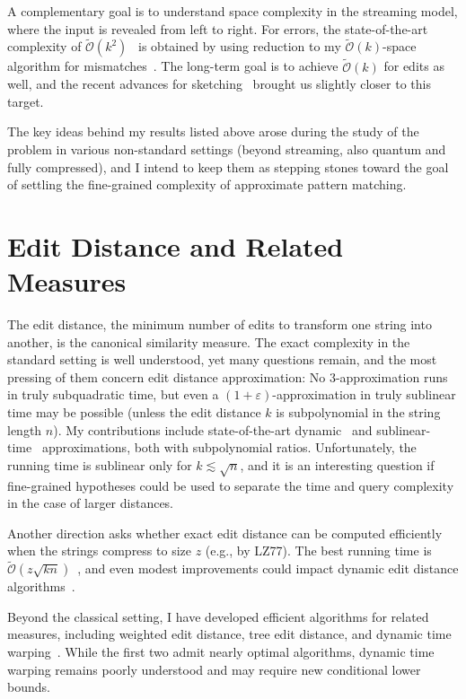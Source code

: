 \documentclass[a4paper,11pt]{article}
\newcommand{\eps}{\varepsilon}
\newcommand{\Ohtilde}{\tilde{\mathcal{O}}}
\begin{document}
A complementary goal is to understand space complexity in the streaming model, where the input is revealed from left to right.
For errors, the state-of-the-art complexity of $\Ohtilde(k^2)$~\cite{BK23a} is obtained by using reduction to my $\Ohtilde(k)$-space algorithm for mismatches~\cite{CKP19}. The long-term goal is to achieve $\Ohtilde(k)$ for edits as well, and the recent advances for sketching~\cite{KS24} brought us slightly closer to this target.

The key ideas behind my results listed above arose during the study of the problem in various non-standard settings (beyond streaming, also quantum and fully compressed), and I intend to keep them as stepping stones toward the goal of settling the fine-grained complexity of approximate pattern matching.


\section{Edit Distance and Related Measures}

The edit distance, the minimum number of edits to transform one string into another, is the canonical similarity measure. 
The exact complexity in the standard setting is well understood, yet many questions remain, and the most pressing of them concern edit distance approximation:
No $3$-approximation runs in truly subquadratic time, but even a $(1+\eps)$-approximation in truly sublinear time may be possible (unless the edit distance $k$ is subpolynomial in the string length $n$).
My contributions include state-of-the-art dynamic~\cite{KMS23} and sublinear-time~\cite{BCFK24,GKKS22} approximations, both with subpolynomial ratios.
Unfortunately, the running time is sublinear only for $k \lesssim \sqrt{n}$, and it is an interesting question if fine-grained hypotheses could be used to separate the time and query complexity in the case of larger distances.


Another direction asks whether exact edit distance can be computed efficiently when the strings compress to size $z$ (e.g., by LZ77). 
The best running time is $\Ohtilde(z\sqrt{kn})$~\cite{GKLS22}, and even modest improvements could impact dynamic edit distance algorithms~\cite{GK25}.  

Beyond the classical setting, I have developed efficient algorithms for related measures, including weighted edit distance, tree edit distance, and dynamic time warping~\cite{DGHKS23,Kus19}. 
While the first two admit nearly optimal algorithms, dynamic time warping remains poorly understood and may require new conditional lower bounds.  
\end{document}
